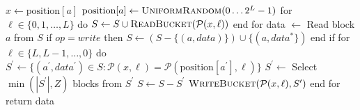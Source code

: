 $x \gets \text{position}[a]$
$\text{position}[a] \gets \textsc{UniformRandom} (0 \ldots 2^L - 1)$
for $\ell \in \{ 0, 1, \ldots , L \}$ do
    $S \gets S \cup \textsc{ReadBucket}(\mathcal{P}(x, \ell))$
end for
data $\gets$ Read block $a$ from $S$
if $op = write$ then
    $S \gets (S - \{ (a, data) \} ) \cup \{ (a, data^{*} \} )$
end if
for $\ell \in \{ L, L-1, \ldots , 0 \}$ do
    $S^\prime \gets \{ (a^\prime, data^\prime) \in S : \mathcal{P}(x, \ell) = \mathcal{P}( \text{position}[a^\prime], \ell) \}$
    $S^\prime \gets$ Select $\min ( | S^\prime |, Z)$ blocks from $S^\prime$
    $S \gets S - S^\prime$
    $\textsc{WriteBucket} (\mathcal{P} (x, \ell), S^\prime)$
end for
return data
